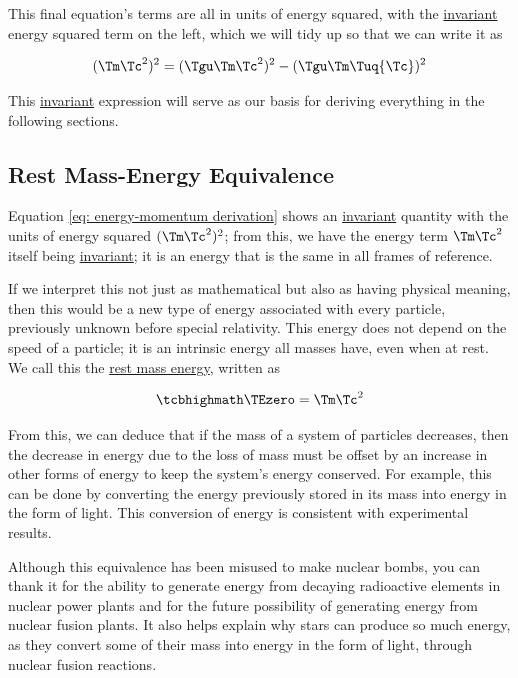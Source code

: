 This final equation's terms are all in units of energy squared, with the \hyperlink{def-lorentz-invariant}{invariant} energy squared term on the left, which we will tidy up so that we can write it as

\begin{equation}
	\label{eq: energy-momentum derivation}
	(\Tm  \Tc ^2)^2  = (\Tgu  \Tm  \Tc ^2)^2 - (\Tgu  \Tm  \Tuq  {\Tc })^2
\end{equation}

This \hyperlink{def-lorentz-invariant}{invariant} expression will serve as our basis for deriving everything in the following sections.

\subsection{Rest Mass-Energy Equivalence}\label{subsect: Rest Mass-Energy Equivalence}

Equation \eqref{eq: energy-momentum derivation} shows an \hyperlink{def-lorentz-invariant}{invariant} quantity with the units of energy squared $(\Tm  \Tc ^2)^2$; from this, we have the energy term $\Tm  \Tc ^2$ itself being \hyperlink{def-lorentz-invariant}{invariant}; it is an energy that is the same in all frames of reference.

If we interpret this not just as mathematical but also as having physical meaning, then this would be a new type of energy associated with every particle, previously unknown before special relativity.
This energy does not depend on the speed of a particle; it is an intrinsic energy all masses have, even when at rest.
We call this the \hyperlink{def-rest-mass-energy}{rest mass energy}, written as

\begin{equation}
	\label{eq: rest mass energy}
	\mhl{
		\TEzero =\Tm \Tc ^2
	}
\end{equation}

From this, we can deduce that if the mass of a system of particles decreases, then the decrease in energy due to the loss of mass must be offset by an increase in other forms of energy to keep the system's energy conserved.
For example, this can be done by converting the energy previously stored in its mass into energy in the form of light.
This conversion of energy is consistent with experimental results.

Although this equivalence has been misused to make nuclear bombs, you can thank it for the ability to generate energy from decaying radioactive elements in nuclear power plants and for the future possibility of generating energy from nuclear fusion plants.
It also helps explain why stars can produce so much energy, as they convert some of their mass into energy in the form of light, through nuclear fusion reactions.

